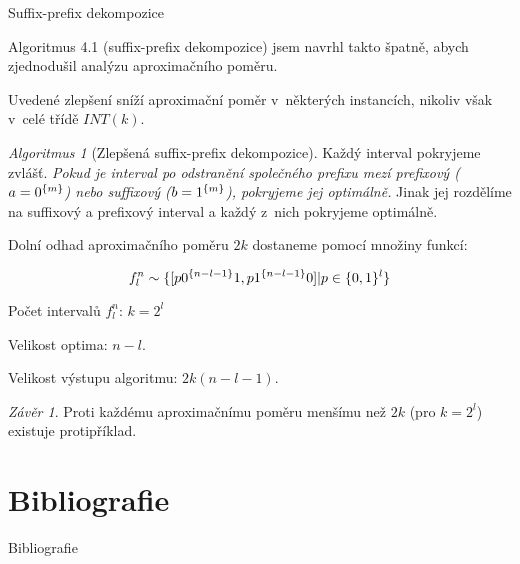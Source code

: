\documentclass{beamer}
\theoremstyle{remark}
\newtheorem{algorithm}{Algoritmus}
\newtheorem{conclusion}{Závěr}
\begin{document}
\begin{frame}{Suffix-prefix dekompozice}

Algoritmus 4.1 (suffix-prefix dekompozice) jsem navrhl takto špatně, abych zjednodušil analýzu aproximačního poměru.

Uvedené zlepšení sníží aproximační poměr v~některých instancích, nikoliv však v~celé třídě $INT(k)$.

\begin{algorithm}[Zlepšená suffix-prefix dekompozice]
Každý interval pokryjeme zvlášť.
\emph{Pokud je interval po odstranění společného prefixu mezí prefixový ($a = 0^{\{m\}}$) nebo suffixový ($b = 1^{\{m\}}$), pokryjeme jej optimálně.}
Jinak jej rozdělíme na suffixový a prefixový interval a každý z~nich pokryjeme optimálně.
\end{algorithm}


Dolní odhad aproximačního poměru $2k$ dostaneme pomocí množiny  funkcí:

$$
f_l^n \sim \{[p 0^{\{n-l-1\}} 1, p 1^{\{n-l-1\}} 0] | p \in \{0, 1\}^l\}
$$

Počet intervalů $f_l^n$: $k = 2^l$

Velikost optima: $n-l$.

Velikost výstupu algoritmu: $2k (n-l-1)$.

\begin{conclusion}
Proti každému aproximačnímu poměru menšímu než $2k$ (pro $k = 2^l$) existuje protipříklad.
\end{conclusion}
\end{frame}

\section{Bibliografie}

\begin{frame}{Bibliografie}

\end{frame}
\end{document}
